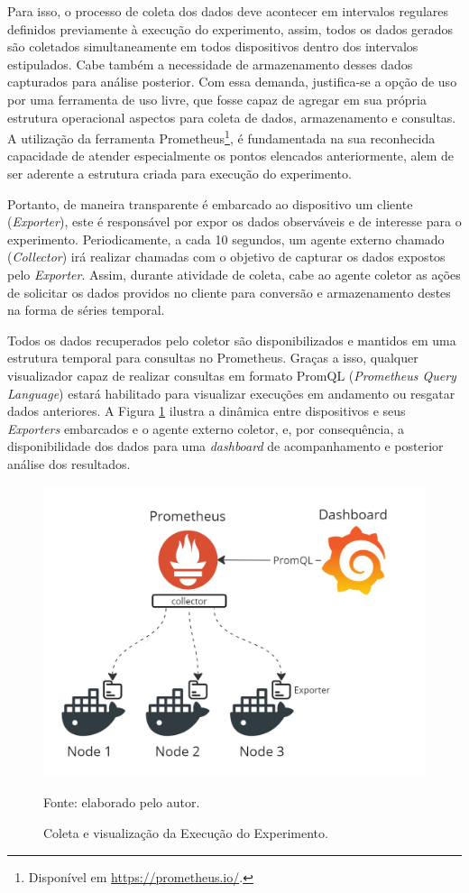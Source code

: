 Para isso, o processo de coleta dos dados deve acontecer em intervalos regulares definidos previamente à execução do experimento, assim, todos os dados gerados são coletados simultaneamente em todos dispositivos dentro dos intervalos estipulados. Cabe também a necessidade de armazenamento desses dados capturados para análise posterior. Com essa demanda, justifica-se a opção de uso por uma ferramenta de uso livre, que fosse capaz de agregar em sua própria estrutura operacional aspectos para coleta de dados, armazenamento e consultas. A utilização da ferramenta Prometheus\footnote{Disponível em \url{https://prometheus.io/}.}, é fundamentada na sua reconhecida capacidade de atender especialmente os pontos elencados anteriormente, alem de ser aderente a estrutura criada para execução do experimento.

Portanto, de maneira transparente é embarcado ao dispositivo um cliente (\textit{Exporter}), este é responsável por expor os dados observáveis e de interesse para o experimento. Periodicamente, a cada 10 segundos, um agente externo chamado (\textit{Collector}) irá realizar chamadas com o objetivo de capturar os dados expostos pelo \textit{Exporter}. Assim, durante atividade de coleta, cabe ao agente coletor as ações de solicitar os dados providos no cliente para conversão e armazenamento destes na forma de séries temporal. 

Todos os dados recuperados pelo coletor são disponibilizados e mantidos em uma estrutura temporal para consultas no Prometheus. Graças a isso, qualquer visualizador capaz de realizar consultas em formato PromQL (\textit{Prometheus Query Language}) estará habilitado para visualizar execuções em andamento ou resgatar dados anteriores. A Figura \ref{fig:cap6instrumentalizacao} ilustra a dinâmica entre dispositivos e seus \textit{Exporters} embarcados e o agente externo coletor, e, por consequência, a disponibilidade dos dados para uma \textit{dashboard} de acompanhamento e posterior análise dos resultados. 

\begin{figure}[H]
	\centering
	
	\caption{Coleta e visualização da Execução do Experimento.}
	\label{fig:cap6instrumentalizacao}
	\noindent\includegraphics[width=0.75\linewidth]{Imagens/cap6/cap6instrumentalizacao.jpg} 
	
	Fonte: elaborado pelo autor.
\end{figure}


